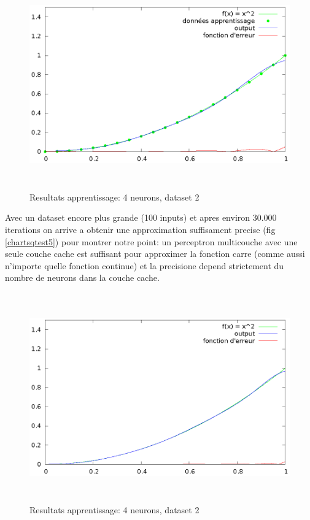 \documentclass[twoside,openright,a4paper,11pt,french]{article}
\begin{document}
\begin{figure}[h]
\centering
\includegraphics[width=12cm,height=9cm]{./pics/chartsqtest4.eps}
\caption{Resultats apprentissage: 4 neurons, dataset 2}
\label{fig:chartsqtest4}
\end{figure}

Avec un dataset encore plus grande (100 inputs) et apres environ
30.000 iterations on arrive a obtenir une approximation suffisament
precise (fig \ref{chartsqtest5}) pour montrer notre point:
un perceptron multicouche avec une seule couche cache est suffisant pour
approximer la fonction carre (comme aussi n'importe quelle fonction continue) 
et la precisione depend strictement du nombre de neurons dans la couche cache.

\begin{figure}[h]
\centering
\includegraphics[width=12cm,height=9cm]{./pics/chartsqtest5.eps}
\caption{Resultats apprentissage: 4 neurons, dataset 2}
\label{fig:chartsqtest5}
\end{figure}


\clearpage
{}


\end{document}
